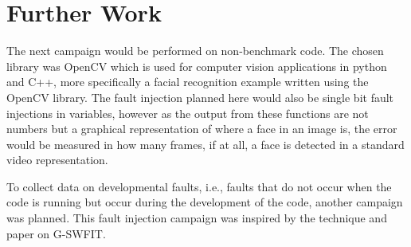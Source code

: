 \section{Further Work}

The next campaign would be performed on non-benchmark code. The chosen library was OpenCV which is used for computer vision applications in python and C++, more specifically a facial recognition example written using the OpenCV library. The fault injection planned here would also be single bit fault injections in variables, however as the output from these functions are not numbers but a graphical representation of where a face in an image is, the error would be measured in how many frames, if at all, a face is detected in a standard video representation.

To collect data on developmental faults, i.e., faults that do not occur when the code is running but occur during the development of the code, another campaign was planned. This fault injection campaign was inspired by the technique and paper on G-SWFIT.

